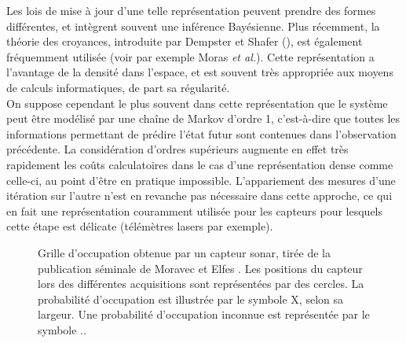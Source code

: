 Les lois de mise à jour d'une telle représentation peuvent prendre des formes différentes, et intègrent souvent une inférence Bayésienne. Plus récemment, la théorie des croyances, introduite par Dempster et Shafer (\cite{Dempster1967}), est également fréquemment utilisée (voir par exemple Moras \textit{et al.}\cite{Moras2011a}). Cette représentation a l'avantage de la densité dans l'espace, et est souvent très appropriée aux moyens de calculs informatiques, de part sa régularité. \\
On suppose cependant le plus souvent dans cette représentation que le système peut être modélisé par une chaîne de Markov d'ordre 1, c'est-à-dire que toutes les informations permettant de prédire l'état futur sont contenues dans l'observation précédente. La considération d'ordres supérieurs augmente en effet très rapidement les coûts calculatoires dans le cas d'une représentation \og dense\fg{} comme celle-ci, au point d'être en pratique impossible. L'appariement des mesures d'une itération sur l'autre n'est en revanche pas nécessaire dans cette approche, ce qui en fait une représentation couramment utilisée pour les capteurs pour lesquels cette étape est délicate (télémètres lasers par exemple). 

\begin{figure}
	\caption{Grille d'occupation obtenue par un capteur sonar, tirée de la publication séminale de Moravec et Elfes \cite{Moravec1985}. Les positions du capteur lors des différentes acquisitions sont représentées par des cercles. La probabilité d'occupation est illustrée par le symbole \og X\fg{}, selon sa largeur. Une probabilité d'occupation inconnue est représentée par le symbole \og .\fg{}.}
	\label{fig:ch2_grille_occupation}
\end{figure}

